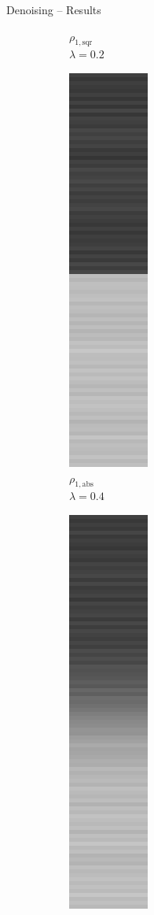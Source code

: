 \documentclass[t]{beamer}
\begin{document}
\begin{frame}{Denoising -- Results}
\begin{figure}[t]
\begin{subfigure}[t]{0.08\textwidth}
				\tiny $\rho_{1,\text{sqr}}$\\[2px]
				\tiny $\lambda = 0.2$
			\end{subfigure}
			\begin{subfigure}[t]{0.08\textwidth}
				\includegraphics[scale=0.25]{../paper/pictures/denoising/signal/ipiano_absolute_04.png}\\
				\tiny $\rho_{1,\text{abs}}$\\[2px]
				\tiny $\lambda = 0.4$
			\end{subfigure}
			\begin{subfigure}[t]{0.08\textwidth}
				\includegraphics[scale=0.25]{../paper/pictures/denoising/signal/ipiano_squared_04.png}\\

\end{subfigure}
\end{figure}
\end{frame}
\end{document}
